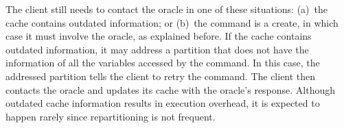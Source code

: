 The client still needs to contact the oracle in one of these situations:
(a)~the cache contains outdated information; or (b)~the command is a create, in
which case it must involve the oracle, as explained before.
If the cache contains outdated information, it may address a partition that does
not have the information of all the variables accessed by the command. In this
case, the addressed partition tells the client to retry the command. The client
then contacts the oracle and updates its cache with the oracle's response.
Although outdated cache information results in execution overhead, it is
expected to happen rarely since repartitioning is not frequent.






